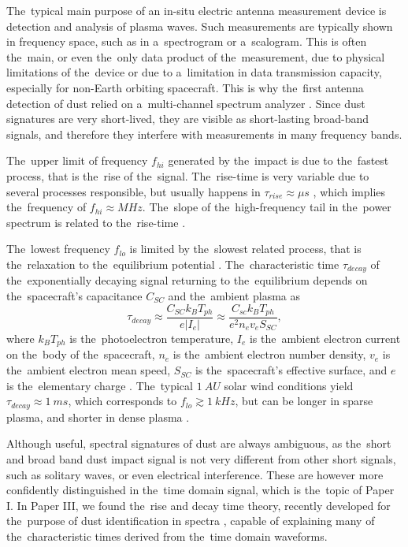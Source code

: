 The~typical main purpose of an in-situ electric antenna measurement device is detection and analysis of plasma waves. Such measurements are typically shown in frequency space, such as in a~spectrogram or a~scalogram. This is often the~main, or even the~only data product of the~measurement, due to physical limitations of the~device or due to a~limitation in data transmission capacity, especially for non-Earth orbiting spacecraft. This is why the~first antenna detection of dust relied on a~multi-channel spectrum analyzer \citep{scarf1982voyager}. Since dust signatures are very short-lived, they are visible as short-lasting broad-band signals, and therefore they interfere with measurements in many frequency bands. 

The~upper limit of frequency $f_{hi}$ generated by the~impact is due to the~fastest process, that is the~rise of the~signal. The~rise-time is very variable due to several processes responsible, but usually happens in $\tau_{rise} \approx \si{\mu s}$ \citep{meyer2017frequency,shen2023variability}, which implies the~frequency of $f_{hi} \approx \si{M Hz}$. The~slope of the~high-frequency tail in the~power spectrum is related to the~rise-time \citep{meyer2017frequency}. 

The~lowest frequency $f_{lo}$ is limited by the~slowest related process, that is the~relaxation to the~equilibrium potential \citep{zaslavsky2015floating}. The~characteristic time $\tau_{decay}$ of the~exponentially decaying signal returning to the~equilibrium depends on the~spacecraft's capacitance $C_{SC}$ and the~ambient plasma as 
\begin{equation}    
\tau_{decay} \approx \frac{C_{SC} k_B T_{ph}}{e|I_{e}|} \approx \frac{C_{sc} k_B T_{ph}}{e^2 n_e v_e S_{SC}}, 
\end{equation}
where $k_B T_{ph}$ is the~photoelectron temperature, $I_e$ is the~ambient electron current on the~body of the~spacecraft, $n_e$ is the~ambient electron number density, $v_e$ is the~ambient electron mean speed, $S_{SC}$ is the~spacecraft's effective surface, and $e$ is the~elementary charge \citep{henri2011observations}. The~typical $\SI{1}{AU}$ solar wind conditions yield $\tau_{decay} \approx \SI{1}{m s}$, which corresponds to $f_{lo} \gtrsim \SI{1}{kHz}$, but can be longer in sparse plasma, and shorter in dense plasma \citep{zaslavsky2015floating,vaverka2017detection,meyer2017frequency}. 

Although useful, spectral signatures of dust are always ambiguous, as the~short and broad band dust impact signal is not very different from other short signals, such as solitary waves, or even electrical interference. These are however more confidently distinguished in the~time domain signal, which is the~topic of Paper I. In Paper III, we found the~rise and decay time theory, recently developed for the~purpose of dust identification in spectra \citep{meyer2017frequency}, capable of explaining many of the~characteristic times derived from the~time domain waveforms.

